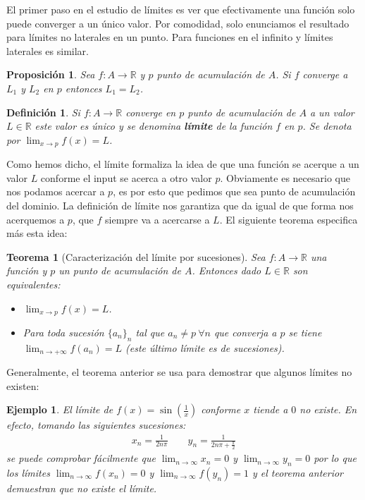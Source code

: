 \documentclass{article}
\newtheorem{theorem}{Teorema}
\newtheorem{prop}{Proposición}
\newtheorem{define}{Definición}
\newtheorem{ejem}{Ejemplo}
\newcommand{\reales}{\mathbb{R}}
\begin{document}
El primer paso en el estudio de límites es ver que efectivamente una función solo puede converger a un único valor. Por comodidad, solo enunciamos el resultado para límites no laterales en un punto. Para funciones en el infinito y límites laterales es similar.

\begin{prop}
	Sea $f: A \rightarrow \reales$ y $p$ punto de acumulación de $A$. Si $f$ converge a $L_1$ y $L_2$ en $p$ entonces $L_1 = L_2$.
\end{prop}

\begin{define}
	Si $f: A \rightarrow \reales$ converge en $p$ punto de acumulación de $A$ a un valor $L \in \reales$ este valor es único y se denomina \textbf{límite} de la función $f$ en $p$. Se denota por $\lim_{x \rightarrow p} f(x) = L$.
\end{define}

Como hemos dicho, el límite formaliza la idea de que una función se acerque a un valor $L$ conforme el input se acerca a otro valor $p$. Obviamente es necesario que nos podamos acercar a $p$, es por esto que pedimos que sea punto de acumulación del dominio. La definición de límite nos garantiza que da igual de que forma nos acerquemos a $p$, que $f$ siempre va a acercarse a $L$. El siguiente teorema especifica más esta idea:
\begin{theorem}[Caracterización del límite por sucesiones]
	Sea $f: A \rightarrow \reales$ una función y $p$ un punto de acumulación de $A$. Entonces dado $L \in \reales$ son equivalentes:
	\begin{itemize}
		\item
		$\lim_{x \rightarrow p} f(x) = L$.
		\item
		Para toda sucesión $\{a_n \}_n$ tal que $a_n \neq p\ \forall n$ que converja a $p$ se tiene $\lim_{n \rightarrow +\infty} f(a_n) = L$ (este último límite es de sucesiones).
	\end{itemize}
\end{theorem}

Generalmente, el teorema anterior se usa para demostrar que algunos límites no existen:
\begin{ejem}
	El límite de $f(x) = \sin (\frac{1}{x})$ conforme $x$ tiende a $0$ no existe. En efecto, tomando las siguientes sucesiones:
	\begin{align*}
		x_n = \frac{1}{2n\pi} \qquad y_n = \frac{1}{2n\pi + \frac{\pi}{2}}
	\end{align*}
	se puede comprobar fácilmente que $\lim_{n\rightarrow\infty} x_n = 0$ y $\lim_{n\rightarrow\infty} y_n = 0$ por lo que los límites $\lim_{n\rightarrow\infty}f(x_n) = 0$ y $\lim_{n\rightarrow\infty}f(y_n) = 1$ y el teorema anterior demuestran que no existe el límite.
\end{ejem}
\end{document}
